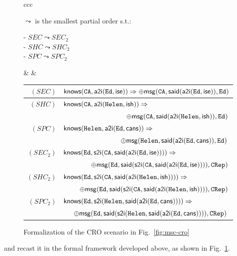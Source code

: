 \documentclass[conference]{llncs}
\newcommand{\theCA}{\ensuremath \mathtt{CA}}
\newcommand{\Ed}{\ensuremath \mathtt{Ed}}
\newcommand{\Helen}{\ensuremath \mathtt{Helen}}
\newcommand{\CRep}{\ensuremath \mathtt{CRep}}
\newcommand{\canstoredoc}{\ensuremath \mathsf{cans}}
\newcommand{\ishead}{\ensuremath \mathsf{ish}}
\newcommand{\isemployee}{\ensuremath \mathsf{ise}}
\newcommand{\know}{\ensuremath \mathsf{knows}}
\newcommand{\msg}{\ensuremath \mathsf{msg}}
\newcommand{\atoi}{\ensuremath \mathsf{a2i}}
\newcommand{\stoi}{\ensuremath \mathsf{s2i}}
\newcommand{\said}{\ensuremath \mathsf{said}}
\newcommand{\CRO}{CRO}
\begin{document}
{\begin{example}
\begin{figure}[t]
\begin{tabular}{ccc}
\begin{minipage}{2.9cm}
$\leadsto$ is the smallest partial order s.t.: \

     \begin{center}
      - $\mathit{SEC}\leadsto \mathit{SEC}_2$ \\
      - $\mathit{SHC}\leadsto \mathit{SHC}_2$\\
      - $\mathit{SPC}\leadsto \mathit{SPC}_2$
     \end{center}
    \end{minipage} 
    & \quad &
    \begin{minipage}{.75\textwidth}
      {\footnotesize
      \begin{tabular}{|r|l|}
        \hline
        $(SEC)$ & $\know(\theCA, \atoi(\Ed,\isemployee)) \Rightarrow
                   \oplus \msg(\theCA,\said(\atoi(\Ed,\isemployee)),\Ed)$ 
        \\ \hline
        $(SHC)$ & $\know(\theCA, \atoi(\Helen,\ishead)) \Rightarrow$ \\
                & $\,\quad\quad\quad\quad\quad\quad\quad\quad\quad \oplus \msg(\theCA,\said(\atoi(\Helen,\ishead)),\Ed)$
        \\ \hline
        $(SPC)$ & $\know(\Helen, \atoi(\Ed,\canstoredoc)) \Rightarrow$ \\
                & $\,\,\quad\quad\quad\quad\quad\quad\quad\quad    \oplus \msg(\Helen,\said(\atoi(\Ed,\canstoredoc)),\Ed)$
        \\ \hline
        $(SEC_2)$ & $\know(\Ed, \stoi(\theCA, \said(\atoi(\Ed,\isemployee))))
        \Rightarrow$ \\
                  & $\quad\quad\quad\quad\oplus \msg(\Ed,\said(\stoi(\theCA, \said(\atoi(\Ed,\isemployee)))),\CRep)$
        \\ \hline
        $(SHC_2)$ & $\know(\Ed, \stoi(\theCA, \said(\atoi(\Helen,\ishead)))) \Rightarrow$ \\
                  & $\,\,\quad\quad \oplus \msg(\Ed,\said(\stoi(\theCA, \said(\atoi(\Helen, \ishead)))),\CRep)$
        \\ \hline
        $(SPC_2)$ & $\know(\Ed, \stoi(\Helen, \said(\atoi(\Ed,\canstoredoc)))) \Rightarrow$ \\
        & $\,\,\,\quad \oplus \msg(\Ed,\said(\stoi(\Helen, \said(\atoi(\Ed, \canstoredoc)))),\CRep)$
        \\ \hline
        \end{tabular}}
    \end{minipage}
    \end{tabular}
  \caption{\label{fig:msccerts}Formalization of the \CRO{} scenario in Fig.~\ref{fig:msc-cro}}
\end{figure}
and recast it in the formal framework developed above, as shown in
Fig.~\ref{fig:msccerts}.  


\end{example}}
\end{document}
